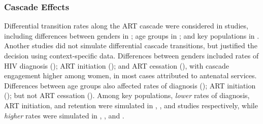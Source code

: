 \subsubsection{Cascade Effects}
\label{sss:res:cas}
Differential transition rates along the ART cascade were considered in
 studies, including differences between
genders in ;
age groups in ; and
key populations in .
Another  studies did not simulate differential cascade transitions,
but justified the decision using context-specific data.
Differences between genders included rates of
HIV diagnosis ();
ART initiation (); and
ART cessation (),
with cascade engagement higher among women,
in most cases attributed to antenatal services.
Differences between age groups also affected
rates of diagnosis ();
ART initiation ();
but not ART cessation (). %
Among key populations, \emph{lower} rates of
diagnosis, ART initiation, and retention were simulated in
, , and 
studies respectively, while \emph{higher} rates were simulated in
, , and .
